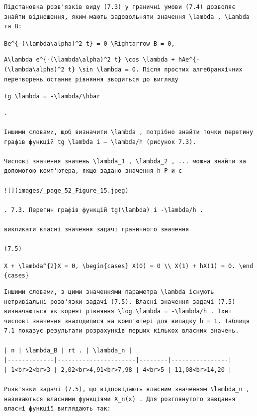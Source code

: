 \documentclass[
  ukrainian,
]{article}
\begin{document}
\begin{verbatim}
Підстановка розв'язків виду (7.3) у граничні умови (7.4) дозволяє знайти відношення, яким мають задовольняти значення \lambda , \Lambda та B:
\end{verbatim}

\texttt{Be\^{}\{-(\textbackslash{}lambda\textbackslash{}alpha)\^{}2\ t\}\ =\ 0\ \textbackslash{}Rightarrow\ B\ =\ 0,}

\begin{verbatim}
A\lambda e^{-(\lambda\alpha)^2 t} \cos \lambda + hAe^{-(\lambda\alpha)^2 t} \sin \lambda = 0. Після простих алгебранхічних перетворень останнє рівняння зводиться до вигляду
\end{verbatim}

\texttt{tg\ \textbackslash{}lambda\ =\ -\textbackslash{}lambda/\textbackslash{}hbar}

\begin{verbatim}
.

Іншими словами, щоб визначити \lambda , потрібно знайти точки перетину графів функцій tg \lambda і — \lambda/h (рисунок 7.3).

Числові значення значень \lambda_1 , \lambda_2 , ... можна знайти за допомогою комп'ютера, якщо задано значення h Р и с

![](images/_page_52_Figure_15.jpeg)

. 7.3. Перетин графів функцій tg(\lambda) і -\lambda/h .

викликати власні значення задачі граничного значення

(7.5)
\end{verbatim}

\texttt{X\textquotesingle{}\textquotesingle{}\ +\ \textbackslash{}lambda\^{}\{2\}X\ =\ 0,\ \textbackslash{}begin\{cases\}\ X(0)\ =\ 0\ \textbackslash{}\textbackslash{}\ X\textquotesingle{}(1)\ +\ hX(1)\ =\ 0.\ \textbackslash{}end\{cases\}}

\begin{verbatim}
Іншими словами, з цими значеннями параметра \lambda існують нетривіальні розв'язки задачі (7.5). Власні значення задачі (7.5) визначаються як корені рівняння \log \lambda = -\lambda/h . Їхні числові значення знаходилися на комп'ютері для випадку h = 1. Таблиця 7.1 показує результати розрахунків перших кількох власних значень.

| n | \lambda_B | rt . | \lambda_n |
|-------------|----------------------|--------|----------------|
| 1<br>2<br>3 | 2,02<br>4,91<br>7,98 | 4<br>5 | 11,08<br>14,20 |

Розв'язки задачі (7.5), що відповідають власним значенням \lambda_n , називаються власними функціями X_n(x) . Для розглянутого завдання власні функції виглядають так:
\end{verbatim}
\end{document}
